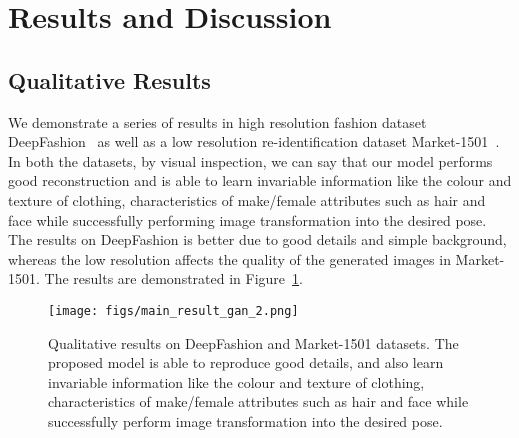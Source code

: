 \documentclass[runningheads]{llncs}
\begin{document}
\section{Results and Discussion}
\subsection{Qualitative Results}
We demonstrate a series of results in high resolution fashion dataset DeepFashion~\cite{deepfashion} as well as a low resolution re-identification dataset Market-1501~\cite{market-1501}. In both the datasets, by visual inspection, we can say that our model performs good reconstruction and is able to learn invariable information like the colour and texture of clothing, characteristics of make/female attributes such as hair and face while successfully performing image transformation into the desired pose. The results on DeepFashion is better due to good details and simple background, whereas the low resolution affects the quality of the generated images in Market-1501. The results are demonstrated in Figure~\ref{fig:main_result}.
\vspace{-2mm}
\begin{figure}[!ht]
	\centering
	\texttt{[image: figs/main\_result\_gan\_2.png]}
	\caption{Qualitative results on DeepFashion and Market-1501 datasets. The proposed model is able to reproduce good details, and also learn invariable information like the colour and texture of clothing, characteristics of make/female attributes such as hair and face while successfully perform image transformation into the desired pose.}
	\label{fig:main_result}
\end{figure}
\vspace{-8mm}
%
\end{document}
